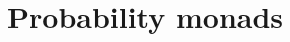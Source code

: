 \documentclass[mathserif,handout]{beamer}
\begin{document}

\section{Probability monads}
\end{document}
